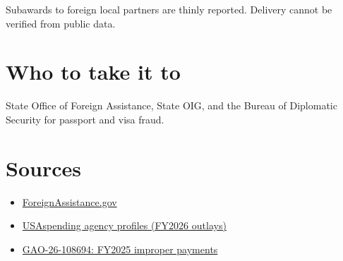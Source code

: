 \documentclass[letterpaper,11pt]{article}
\providecommand{\tightlist}{\setlength{\itemsep}{0pt}\setlength{\parskip}{0pt}}
\begin{document}
Subawards to foreign local partners are thinly reported. Delivery cannot
be verified from public data.

\hypertarget{who-to-take-it-to}{%
\section{Who to take it to}\label{who-to-take-it-to}}

State Office of Foreign Assistance, State OIG, and the Bureau of
Diplomatic Security for passport and visa fraud.

\hypertarget{sources}{%
\section{Sources}\label{sources}}

\begin{itemize}
\tightlist
\item
  \href{https://foreignassistance.gov/}{ForeignAssistance.gov}
\item
  \href{https://www.usaspending.gov/agency}{USAspending agency profiles
  (FY2026 outlays)}
\item
  \href{https://www.gao.gov/products/gao-26-108694}{GAO-26-108694:
  FY2025 improper payments}
\end{itemize}
\end{document}
